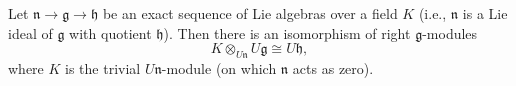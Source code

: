 Let $\mathfrak{n} \to \mathfrak{g} \to \mathfrak{h}$ be an exact sequence of Lie algebras over a field $K$ (i.e., $\mathfrak{n}$ is a Lie ideal of $\mathfrak{g}$ with quotient $\mathfrak{h}$). Then there is an isomorphism of right $\mathfrak{g}$-modules
$$
K \otimes_{U\mathfrak{n}} U\mathfrak{g} \cong U\mathfrak{h},
$$
where $K$ is the trivial $U\mathfrak{n}$-module (on which $\mathfrak{n}$ acts as zero).
